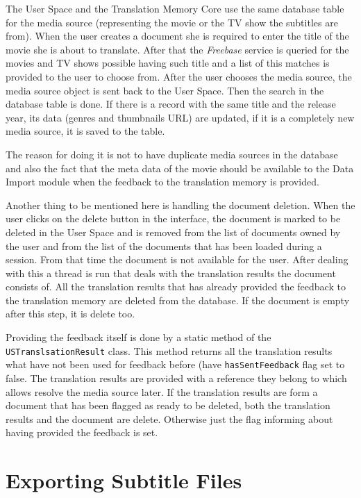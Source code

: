 The User Space and the Translation Memory Core use the same database table for the media source (representing the movie or the TV show the subtitles are from). When the user creates a document she is required to enter the title of the movie she is about to translate. After that the {\it Freebase} service is queried for the movies and TV shows possible having such title and a list of this matches is provided to the user to choose from. After the user chooses the media source, the media source object is sent back to the User Space. Then the search in the database table is done. If there is a record with the same title and the release year, its data (genres and thumbnails URL) are updated, if it is a completely new media source, it is saved to the table.

The reason for doing it is not to have duplicate media sources in the database and also the fact that the meta data of the movie should be available to the Data Import module when the feedback to the translation memory is provided.

Another thing to be mentioned here is handling the document deletion. When the user clicks on the delete button in the interface, the document is marked to be deleted in the User Space and is removed from the list of documents owned  by the user and from the list of the documents that has been loaded during a session. From that time the document is not available for the user. After dealing with this a thread is run that deals with the translation results the document consists of. All the translation results that has already provided the feedback to the translation memory are deleted from the database. If the document is empty after this step, it is delete too.

Providing the feedback itself is done by a static method of the {\tt USTranslsationResult} class. This method returns all the translation results what have not been used for feedback before (have {\tt hasSentFeedback} flag set to false. The translation results are provided with a reference they belong to which allows resolve the media source later. If the translation results are form a document that has been flagged as ready to be deleted, both the translation results and the document are delete. Otherwise just the flag informing about having provided the feedback is set.

\section{Exporting Subtitle Files}
\label{sec:export}

